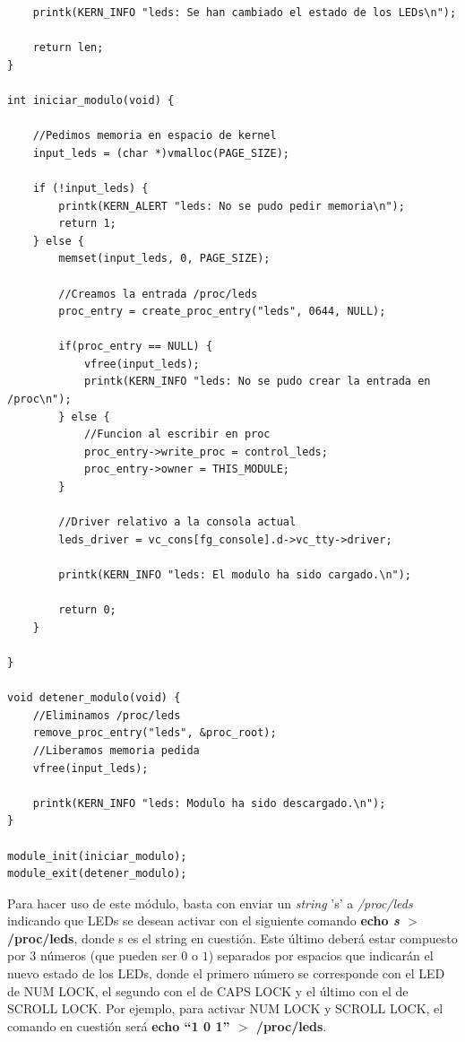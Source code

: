 \documentclass[a4paper,11pt] {article}
\begin{document}
\begin{enumerate}
\begin{verbatim}
    printk(KERN_INFO "leds: Se han cambiado el estado de los LEDs\n");
    
    return len;
}

int iniciar_modulo(void) {

    //Pedimos memoria en espacio de kernel
    input_leds = (char *)vmalloc(PAGE_SIZE);
    
    if (!input_leds) {
        printk(KERN_ALERT "leds: No se pudo pedir memoria\n");
        return 1;
    } else {
        memset(input_leds, 0, PAGE_SIZE);

        //Creamos la entrada /proc/leds
        proc_entry = create_proc_entry("leds", 0644, NULL);

        if(proc_entry == NULL) {
            vfree(input_leds);
            printk(KERN_INFO "leds: No se pudo crear la entrada en /proc\n");
        } else {
            //Funcion al escribir en proc
            proc_entry->write_proc = control_leds; 
            proc_entry->owner = THIS_MODULE;
        }

        //Driver relativo a la consola actual
        leds_driver = vc_cons[fg_console].d->vc_tty->driver;
        
        printk(KERN_INFO "leds: El modulo ha sido cargado.\n");
    
        return 0;
    }
    
}

void detener_modulo(void) {
    //Eliminamos /proc/leds
    remove_proc_entry("leds", &proc_root);
    //Liberamos memoria pedida
    vfree(input_leds);

    printk(KERN_INFO "leds: Modulo ha sido descargado.\n");
}

module_init(iniciar_modulo);
module_exit(detener_modulo);
	\end{verbatim}

	Para hacer uso de este módulo, basta con enviar un \textit{string} 's'  a \textit{/proc/leds} indicando que LEDs se desean activar con el siguiente comando \textbf{echo \textit{s} $>$ /proc/leds}, donde s es el string en cuestión. Este último deberá estar compuesto por 3 números (que pueden ser $0$ o $1$) separados por espacios que indicarán el nuevo estado de los LEDs, donde el primero número se corresponde con el LED de NUM LOCK, el segundo con el de CAPS LOCK y el último con el de SCROLL LOCK. Por ejemplo, para activar NUM LOCK y SCROLL LOCK, el comando en cuestión será \textbf{echo ``1 0 1'' $>$ /proc/leds}.

\end{enumerate}
\end{document}
